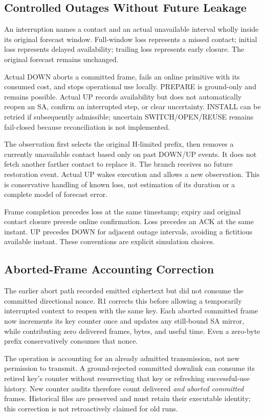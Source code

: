 \documentclass[conference]{IEEEtran}
\begin{document}
\subsection{Controlled Outages Without Future Leakage}
An interruption names a contact and an actual unavailable interval wholly inside its original forecast window. Full-window loss represents a missed contact; initial loss represents delayed availability; trailing loss represents early closure. The original forecast remains unchanged.

Actual DOWN aborts a committed frame, fails an online primitive with its consumed cost, and stops operational use locally. PREPARE is ground-only and remains possible. Actual UP records availability but does not automatically reopen an SA, confirm an interrupted step, or clear uncertainty. INSTALL can be retried if subsequently admissible; uncertain SWITCH/OPEN/REUSE remains fail-closed because reconciliation is not implemented.

The observation first selects the original H-limited prefix, then removes a currently unavailable contact based only on past DOWN/UP events. It does not fetch another farther contact to replace it. The branch receives no future restoration event. Actual UP wakes execution and allows a new observation. This is conservative handling of known loss, not estimation of its duration or a complete model of forecast error.

Frame completion precedes loss at the same timestamp; expiry and original contact closure precede online confirmation. Loss precedes an ACK at the same instant. UP precedes DOWN for adjacent outage intervals, avoiding a fictitious available instant. These conventions are explicit simulation choices.

\subsection{Aborted-Frame Accounting Correction}
The earlier abort path recorded emitted ciphertext but did not consume the committed directional nonce. R1 corrects this before allowing a temporarily interrupted context to reopen with the same key. Each aborted committed frame now increments its key counter once and updates any still-bound SA mirror, while contributing zero delivered frames, bytes, and useful time. Even a zero-byte prefix conservatively consumes that nonce.

The operation is accounting for an already admitted transmission, not new permission to transmit. A ground-rejected committed downlink can consume its retired key's counter without resurrecting that key or refreshing successful-use history. New counter audits therefore count delivered \emph{and aborted committed} frames. Historical files are preserved and must retain their executable identity; this correction is not retroactively claimed for old runs.
\end{document}
